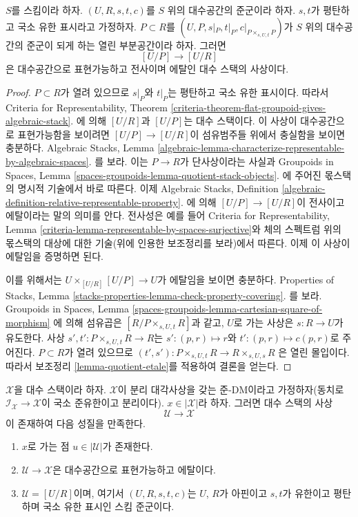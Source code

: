 \begin{lemma}
\label{lemma-quasi-splitting-etale}
$S$를 스킴이라 하자. $(U, R, s, t, c)$를 $S$ 위의 대수공간의 준군이라
하자. $s, t$가 평탄하고 국소 유한 표시라고 가정하자.
$P \subset R$를
$(U, P, s|_P, t|_P, c|_{P \times_{s, U, t} P})$가 $S$ 위의 대수공간의
준군이 되게 하는 열린 부분공간이라 하자. 그러면
$$
[U/P] \longrightarrow [U/R]
$$
은 대수공간으로 표현가능하고 전사이며 에탈인 대수 스택의 사상이다.
\end{lemma}

\begin{proof}
$P \subset R$가 열려 있으므로 $s|_P$와 $t|_P$는 평탄하고 국소 유한
표시이다. 따라서 Criteria for Representability, Theorem
\ref{criteria-theorem-flat-groupoid-gives-algebraic-stack}.
에 의해 $[U/R]$과 $[U/P]$는 대수 스택이다. 이 사상이 대수공간으로
표현가능함을 보이려면 $[U/P] \to [U/R]$이 섬유범주들 위에서 충실함을
보이면 충분하다. Algebraic Stacks, Lemma
\ref{algebraic-lemma-characterize-representable-by-algebraic-spaces}.
를 보라. 이는 $P \to R$가 단사상이라는 사실과 Groupoids in Spaces,
Lemma
\ref{spaces-groupoids-lemma-quotient-stack-objects}.
에 주어진 몫스택의 명시적 기술에서 바로 따른다. 이제 Algebraic Stacks,
Definition
\ref{algebraic-definition-relative-representable-property}.
에 의해 $[U/P] \to [U/R]$이 전사이고 에탈이라는 말의 의미를 안다.
전사성은 예를 들어 Criteria for Representability, Lemma
\ref{criteria-lemma-representable-by-spaces-surjective}와 체의 스펙트럼
위의 몫스택의 대상에 대한 기술(위에 인용한 보조정리를 보라)에서 따른다.
이제 이 사상이 에탈임을 증명하면 된다.

\medskip\noindent
이를 위해서는 $U \times_{[U/R]} [U/P] \to U$가 에탈임을 보이면
충분하다. Properties of Stacks, Lemma
\ref{stacks-properties-lemma-check-property-covering}.
를 보라. Groupoids in Spaces, Lemma
\ref{spaces-groupoids-lemma-cartesian-square-of-morphism}
에 의해 섬유곱은 $[R/P \times_{s, U, t} R]$과 같고, $U$로 가는 사상은
$s : R \to U$가 유도한다. 사상
$s', t' : P \times_{s, U, t} R \to R$는
$s' : (p, r) \mapsto r$와 $t' : (p, r) \mapsto c(p, r)$로 주어진다.
$P \subset R$가 열려 있으므로
$(t', s') : P \times_{s, U, t} R \to R \times_{s, U, s} R$
은 열린 몰입이다. 따라서 보조정리 \ref{lemma-quotient-etale}를 적용하여
결론을 얻는다.
\end{proof}

\begin{lemma}
\label{lemma-etale-local-quasi-DM}
$\mathcal{X}$을 대수 스택이라 하자. $\mathcal{X}$이 분리 대각사상을 갖는
준-DM이라고 가정하자(동치로
$\mathcal{I}_\mathcal{X} \to \mathcal{X}$이 국소 준유한이고 분리이다).
$x \in |\mathcal{X}|$라 하자. 그러면 대수 스택의 사상
$$
\mathcal{U} \longrightarrow \mathcal{X}
$$
이 존재하여 다음 성질을 만족한다.
\begin{enumerate}
\item $x$로 가는 점 $u \in |\mathcal{U}|$가 존재한다.
\item $\mathcal{U} \to \mathcal{X}$은 대수공간으로 표현가능하고 에탈이다.
\item $\mathcal{U} = [U/R]$이며, 여기서 $(U, R, s, t, c)$는 $U$, $R$가
아핀이고 $s, t$가 유한이고 평탄하며 국소 유한 표시인 스킴 준군이다.
\end{enumerate}
\end{lemma}

